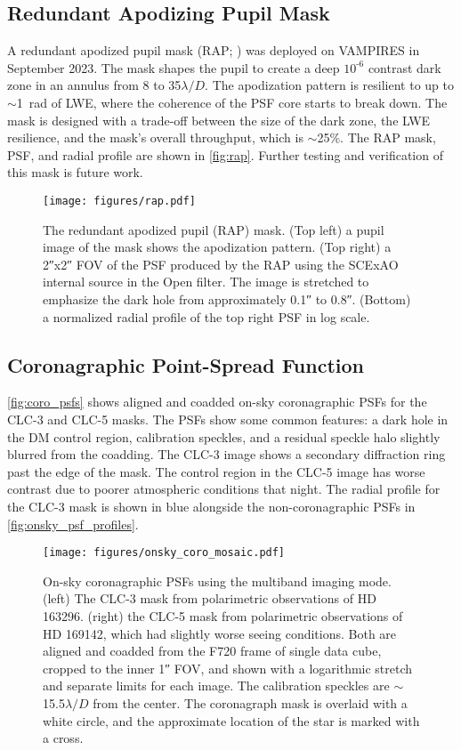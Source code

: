 \subsection{Redundant Apodizing Pupil Mask}

A redundant apodized pupil mask (RAP; \citealp{leboulleux_redundant_2022,leboulleux_coronagraphy_2024}) was deployed on VAMPIRES in September 2023. The mask shapes the pupil to create a deep $10^{\text{-}6}$ contrast dark zone in an annulus from 8 to 35$\lambda/D$. The apodization pattern is resilient to up to  $\sim$\SI{1}{rad} of LWE, where the coherence of the PSF core starts to break down. The mask is designed with a trade-off between the size of the dark zone, the LWE resilience, and the mask's overall throughput, which is $\sim$25\%. The RAP mask, PSF, and radial profile are shown in \autoref{fig:rap}. Further testing and verification of this mask is future work.

\begin{figure}
    \centering
    \texttt{[image: figures/rap.pdf]}
    \caption{The redundant apodized pupil (RAP) mask. (Top left) a pupil image of the mask shows the apodization pattern. (Top right) a \ang{;;2}x\ang{;;2} FOV of the PSF produced by the RAP using the SCExAO internal source in the Open filter. The image is stretched to emphasize the dark hole from approximately \ang{;;0.1} to \ang{;;0.8}. (Bottom) a normalized radial profile of the top right PSF in log scale.\label{fig:rap}}
\end{figure}

\subsection{Coronagraphic Point-Spread Function}

\autoref{fig:coro_psfs} shows aligned and coadded on-sky coronagraphic PSFs for the CLC-3 and CLC-5 masks. The PSFs show some common features: a dark hole in the DM control region, calibration speckles, and a residual speckle halo slightly blurred from the coadding. The CLC-3 image shows a secondary diffraction ring past the edge of the mask. The control region in the CLC-5 image has worse contrast due to poorer atmospheric conditions that night. The radial profile for the CLC-3 mask is shown in blue alongside the non-coronagraphic PSFs in \autoref{fig:onsky_psf_profiles}.

\begin{figure}
    \centering
    \texttt{[image: figures/onsky\_coro\_mosaic.pdf]}
    \caption{On-sky coronagraphic PSFs using the multiband imaging mode. (left) The CLC-3 mask from polarimetric observations of HD 163296. (right) the CLC-5 mask from polarimetric observations of HD 169142, which had slightly worse seeing conditions. Both are aligned and coadded from the F720 frame of single data cube, cropped to the inner \ang{;;1} FOV, and shown with a logarithmic stretch and separate limits for each image. The calibration speckles are $\sim$15.5$\lambda/D$ from the center. The coronagraph mask is overlaid with a white circle, and the approximate location of the star is marked with a cross.\label{fig:coro_psfs}}
\end{figure}


